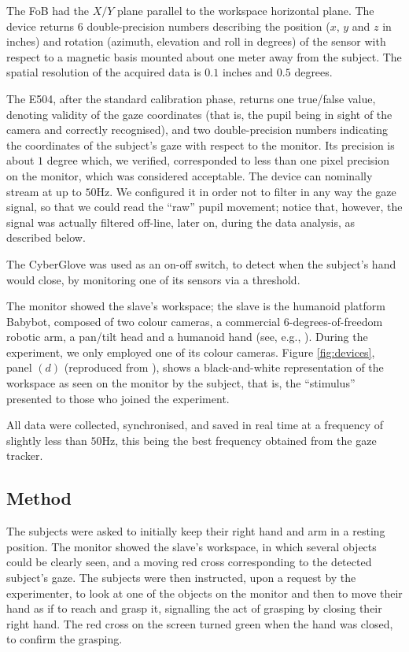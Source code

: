 \documentclass[jou,a4paper,notxfonts]{apa}
\begin{document}
The FoB had the $X/Y$ plane parallel to the workspace horizontal
plane. The device returns $6$ double-precision numbers describing the
position ($x$, $y$ and $z$ in inches) and rotation (azimuth, elevation
and roll in degrees) of the sensor with respect to a magnetic basis
mounted about one meter away from the subject.  The spatial resolution
of the acquired data is $0.1$ inches and $0.5$ degrees.

The E504, after the standard calibration phase, returns one true/false
value, denoting validity of the gaze coordinates (that is, the pupil
being in sight of the camera and correctly recognised), and two
double-precision numbers indicating the coordinates of the subject's
gaze with respect to the monitor. Its precision is about $1$ degree
which, we verified, corresponded to less than one pixel precision on
the monitor, which was considered acceptable. The device can nominally
stream at up to $50$Hz. We configured it in order not to filter in any
way the gaze signal, so that we could read the ``raw'' pupil movement;
notice that, however, the signal was actually filtered off-line, later
on, during the data analysis, as described below.

The CyberGlove was used as an on-off switch, to detect when the
subject's hand would close, by monitoring one of its sensors via a
threshold.

The monitor showed the slave's workspace; the slave is the humanoid
platform Babybot, composed of two colour cameras, a commercial
$6$-degrees-of-freedom robotic arm, a pan/tilt head and a humanoid
hand (see, e.g., \cite{babybotHum2005}). During the experiment, we
only employed one of its colour cameras. Figure \ref{fig:devices},
panel $(d)$ (reproduced from \cite{babybotHum2005}), shows a
black-and-white representation of the workspace as seen on the monitor
by the subject, that is, the ``stimulus'' presented to those who
joined the experiment.

All data were collected, synchronised, and saved in real time at a
frequency of slightly less than $50$Hz, this being the best frequency
obtained from the gaze tracker.

\subsection{Method}

The subjects were asked to initially keep their right hand and arm in
a resting position. The monitor showed the slave's workspace, in which
several objects could be clearly seen, and a moving red cross
corresponding to the detected subject's gaze. The subjects were then
instructed, upon a request by the experimenter, to look at one of the
objects on the monitor and then to move their hand as if to reach and
grasp it, signalling the act of grasping by closing their right
hand. The red cross on the screen turned green when the hand was
closed, to confirm the grasping.
\end{document}
